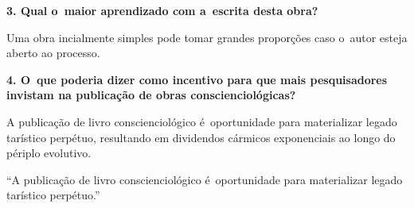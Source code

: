 \documentclass{gescons}
\begin{document}
\begin{multicols}{2}
\textbf{3. Qual o~maior aprendizado com a~escrita desta obra?}

Uma obra incialmente simples pode tomar grandes proporções caso o~autor esteja aberto ao processo. 

\textbf{4. O~que poderia dizer como incentivo para que mais pesquisadores invistam na publicação de obras conscienciológicas?}

A publicação de livro conscienciológico é~oportunidade para materializar legado tarístico perpétuo, resultando em dividendos cármicos exponenciais ao longo do périplo evolutivo.

\begin{pullquote}
    ``A publicação de livro conscienciológico é~oportunidade para materializar legado tarístico perpétuo.''
\end{pullquote}


    
    \end{multicols}
\end{document}
